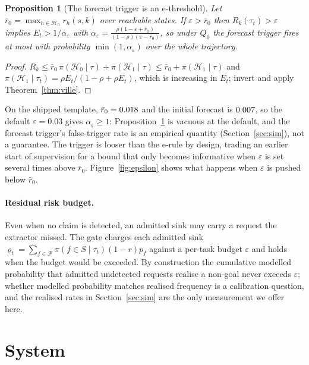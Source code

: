 \documentclass[11pt]{article}
\newtheorem{proposition}{Proposition}
\theoremstyle{definition}
\theoremstyle{remark}
\newcommand{\F}{\mathcal{F}}
\newcommand{\traj}{\tau}
\newcommand{\Hb}{\mathcal{H}_0}
\newcommand{\Ha}{\mathcal{H}_1}
\newcommand{\Qb}{Q_0}
\begin{document}
\begin{proposition}[The forecast trigger is an e-threshold]
\label{prop:forecast}
Let $\bar r_0=\max_{h\in\Hb}r_h(s,k)$ over reachable states. If $\varepsilon>\bar r_0$ then $R_k(\traj_t)>\varepsilon$ implies $E_t>1/\alpha_\varepsilon$ with $\alpha_\varepsilon=\frac{\rho(1-\varepsilon+\bar r_0)}{(1-\rho)(\varepsilon-\bar r_0)}$, so under $\Qb$ the forecast trigger fires at most with probability $\min(1,\alpha_\varepsilon)$ over the whole trajectory.
\end{proposition}
\begin{proof}
$R_k\le\bar r_0\,\pi(\Hb\mid\traj)+\pi(\Ha\mid\traj)\le\bar r_0+\pi(\Ha\mid\traj)$ and $\pi(\Ha\mid\traj_t)=\rho E_t/(1-\rho+\rho E_t)$, which is increasing in $E_t$; invert and apply Theorem~\ref{thm:ville}.
\end{proof}
On the shipped template, $\bar r_0=0.018$ and the initial forecast is $0.007$, so the default $\varepsilon=0.03$ gives $\alpha_\varepsilon\ge1$: Proposition~\ref{prop:forecast} is vacuous at the default, and the forecast trigger's false-trigger rate is an empirical quantity (Section~\ref{sec:sim}), not a guarantee. The trigger is looser than the e-rule by design, trading an earlier start of supervision for a bound that only becomes informative when $\varepsilon$ is set several times above $\bar r_0$. Figure~\ref{fig:epsilon} shows what happens when $\varepsilon$ is pushed below $\bar r_0$.

\paragraph{Residual risk budget.} Even when no claim is detected, an admitted sink may carry a request the extractor missed. The gate charges each admitted sink $\varrho_t=\sum_{f\in\F}\pi(f\in S\mid\traj_t)(1-r)p_f$ against a per-task budget $\varepsilon$ and holds when the budget would be exceeded. By construction the cumulative modelled probability that admitted undetected requests realise a non-goal never exceeds $\varepsilon$; whether modelled probability matches realised frequency is a calibration question, and the realised rates in Section~\ref{sec:sim} are the only measurement we offer here.

\section{System}
\label{sec:system}
\end{document}
